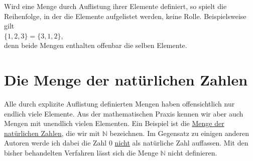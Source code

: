 Wird eine Menge durch Auflistung ihrer Elemente definiert, so spielt die Reihenfolge, in der die
Elemente aufgelistet werden, keine Rolle.  Beispielsweise gilt
\\[0.2cm]
\hspace*{1.3cm}
$\{1,2,3\} = \{3,1,2\}$,
\\[0.2cm]
denn beide Mengen enthalten offenbar die selben Elemente.

\section{Die Menge der nat\"{u}rlichen Zahlen}
Alle durch explizite Auflistung definierten Mengen haben offensichtlich nur endlich viele
Elemente.  Aus der mathematischen Praxis kennen wir aber auch Mengen mit unendlich vielen
Elementen.  Ein Beispiel ist die 
\href{http://en.wikipedia.org/wiki/Natural_number}{Menge der nat\"{u}rlichen Zahlen}, die wir mit $\mathbb{N}$
bezeichnen.  Im Gegensatz zu einigen anderen Autoren werde ich dabei die Zahl $0$ \underline{nicht}
als nat\"{u}rliche Zahl auffassen.  Mit den bisher behandelten Verfahren l\"{a}sst sich die Menge $\mathbb{N}$  nicht definieren.

